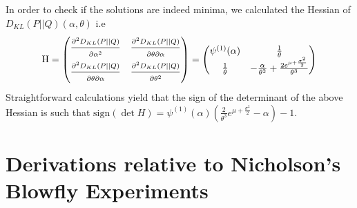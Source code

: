 \documentclass[12pt]{article}
\begin{document}
\begin{appendices}
	In order to check if the solutions are indeed minima, we calculated the Hessian of $D_{KL}(P||Q)(\alpha, \theta)$ i.e
	\begin{equation*}
	\text{H} = \begin{pmatrix}
	\frac{\strut \partial^2 D_{KL}(P||Q)}{\strut \partial \alpha^2} & \frac{\strut \partial^2 D_{KL}(P||Q) }{\strut \partial \theta \partial \alpha} \\
	\frac{\strut \partial^2 D_{KL}(P||Q)}{\strut \partial \theta \partial \alpha} & \frac{\strut \partial^2 D_{KL}(P||Q)}{\strut \partial \theta^2} 
	\end{pmatrix} =
	\begin{pmatrix}
	\psi^{(1)}(\alpha) & \frac{1}{\theta} \\
	\frac{1}{\theta} & -\frac{\alpha}{\theta^2}+\frac{2e^{\mu +\frac{\sigma^2}{2}}}{\theta^3}
	\end{pmatrix}
	\end{equation*}
	Straightforward calculations yield that the sign of the determinant of the above Hessian is such that $\text{sign}(\det{H}) = \psi^{(1)}(\alpha)(\frac{2}{\theta^3}e^{\mu +\frac{\sigma^2}{2}} - \alpha) - 1$.
	
	\section{Derivations relative to Nicholson's Blowfly Experiments} \label{AppendBlowfly}

\end{appendices}
\end{document}
